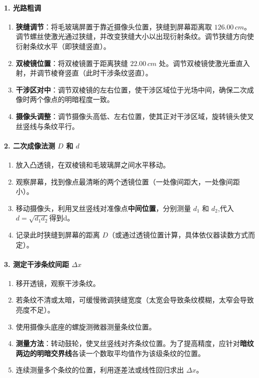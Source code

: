 \documentclass[]{../../templates/Report}%
\begin{document}
\paragraph{1. 光路粗调}
\begin{enumerate}
    \item \textbf{狭缝调节}：将毛玻璃屏置于靠近摄像头位置，狭缝到屏幕距离取 $126.00\,cm$。调节螺丝使激光通过狭缝，并改变狭缝大小以出现衍射条纹。调节狭缝方向使衍射条纹水平（即狭缝竖直）。
    \item \textbf{双棱镜位置}：将双棱镜置于距离狭缝 $22.00\,cm$ 处。调节双棱镜使激光垂直入射，并调节棱脊竖直（此时干涉条纹竖直）。
    \item \textbf{干涉区对中}：调节双棱镜的左右位置，使干涉区域位于光场中间，确保二次成像时两个像点的明暗程度一致。
    \item \textbf{摄像头调整}：调节摄像头高低、左右位置，使其正对干涉区域，旋转镜头使叉丝竖线与条纹平行。
\end{enumerate}


\paragraph{2. 二次成像法测 $D$ 和 $d$}
\begin{enumerate}
    \item 放入凸透镜，在双棱镜和毛玻璃屏之间水平移动。
    \item 观察屏幕，找到像点最清晰的两个透镜位置（一处像间距大，一处像间距小）。
    \item 移动摄像头，利用叉丝竖线对准像点\textbf{中间位置}，分别测量 $d_1$ 和 $d_2$,代入$d=\sqrt{d_1 d_2}$得到d。
    \item 记录此时狭缝到屏幕的距离 $D$（或通过透镜位置计算，具体依仪器读数方式而定）。
\end{enumerate}



\paragraph{3. 测定干涉条纹间距 $\Delta x$}
\begin{enumerate}
    \item 移开透镜，观察干涉条纹。
    \item 若条纹不清或太暗，可缓慢微调狭缝宽度（太宽会导致条纹模糊，太窄会导致亮度不足）。
    \item 使用摄像头底座的螺旋测微器测量条纹位置。
    \item \textbf{测量方法}：转动鼓轮，使叉丝竖线对齐条纹位置。为了提高精度，应针对\textbf{暗纹两边的明暗交界线}各读一个数取平均值作为该级条纹的位置。
    \item 连续测量多个条纹的位置，利用逐差法或线性回归求出 $\Delta x$。
\end{enumerate}
\end{document}

